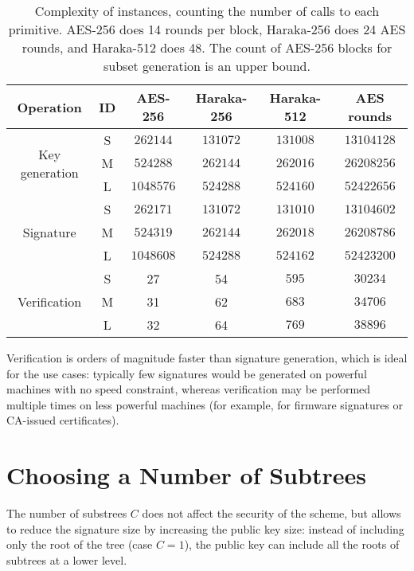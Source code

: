 \begin{table}
\centering 
\begin{tabular}{cc|ccc|c}
\toprule
Operation & ID & AES-256 & Haraka-256 & Haraka-512 & AES rounds \\
\midrule
\multirow{3}{*}{Key generation}
& S & $\num{262144}$ & $\num{131072}$ & $\num{131008}$ & $\num{13104128}$ \\
& M & $\num{524288}$ & $\num{262144}$ & $\num{262016}$ & $\num{26208256}$ \\
& L & $\num{1048576}$ & $\num{524288}$ & $\num{524160}$ & $\num{52422656}$ \\
\midrule
\multirow{3}{*}{Signature}
& S & $\num{262171}$ & $\num{131072}$ & $\num{131010}$ & $\num{13104602}$ \\
&M & $\num{524319}$ & $\num{262144}$ & $\num{262018}$ & $\num{26208786}$ \\
&L & $\num{1048608}$ & $\num{524288}$ & $\num{524162}$ & $\num{52423200}$ \\
\midrule
\multirow{3}{*}{Verification} 
& S & 27 & 54 & $595$ & $\num{30234}$ \\
&M & 31 & 62 & $683$ & $\num{34706}$ \\
&L & 32 & 64 & $769$ & $\num{38896}$ \\
\bottomrule
\end{tabular}

\caption{Complexity of \gravity instances, counting the number of calls to each primitive. AES-256 does 14 rounds per block, Haraka-256 does 24 AES rounds, and Haraka-512 does 48. The count of AES-256 blocks for subset generation is an upper bound.}
\label{tab:complexity}
\end{table}

Verification is orders of magnitude faster than signature generation, which is ideal for the \gravity use cases: typically few signatures would be generated on powerful machines with no speed constraint, whereas verification may be performed multiple times on less powerful machines (for example, for firmware signatures or CA-issued certificates).

\section{Choosing a Number of Subtrees}\label{sec:tradeoff}

The number of substrees $C$ does not affect the security of the scheme, but allows to reduce the signature size by increasing the public key size: instead of including only the root of the tree (case $C=1$), the public key can include all the roots of subtrees at a lower level.

